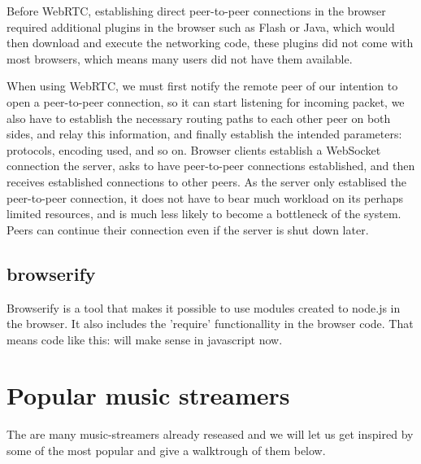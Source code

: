 Before WebRTC, establishing direct peer-to-peer connections in the browser required
additional plugins in the browser such as Flash or Java, which would then download and
execute the networking code,
these plugins did not come with most browsers,
which means many users did not have them available.

\label{webrtc-connection-server}
When using WebRTC, we must first notify the remote peer of our intention
to open a peer-to-peer connection, so it can start listening for incoming packet,
we also have to establish the necessary routing paths to each other peer on both sides,
and relay this information,
and finally establish the intended parameters: protocols, encoding used, and so on.
Browser clients establish a WebSocket connection the server, 
asks to have peer-to-peer connections established,
and then receives established connections to other peers.
As the server only establised the peer-to-peer connection, 
it does not have to bear much workload on its perhaps limited resources,
and is much less likely to become a bottleneck of the system.
Peers can continue their connection even if the server is shut down later.

\section{browserify}
Browserify is a tool that makes it possible to use modules created to node.js in the browser. It also includes the 'require' functionallity in the browser code. That means code like this:
will make sense in javascript now.

\chapter{Popular music streamers}
The are many music-streamers already reseased and we will let us get inspired by some of the most popular and give a walktrough of them below.

